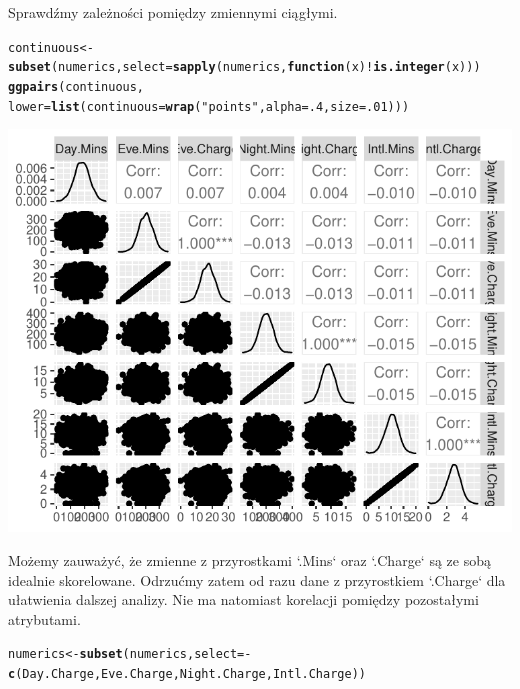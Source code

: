 \documentclass{article}\usepackage[]{graphicx}\usepackage[]{color}
\makeatletter
\def\maxwidth{ %
  \ifdim\Gin@nat@width>\linewidth
    \linewidth
  \else
    \Gin@nat@width
  \fi
}
\newcommand{\hlnum}[1]{\textcolor[rgb]{0.686,0.059,0.569}{#1}}%
\newcommand{\hlstr}[1]{\textcolor[rgb]{0.192,0.494,0.8}{#1}}%
\newcommand{\hlopt}[1]{\textcolor[rgb]{0,0,0}{#1}}%
\newcommand{\hlstd}[1]{\textcolor[rgb]{0.345,0.345,0.345}{#1}}%
\newcommand{\hlkwa}[1]{\textcolor[rgb]{0.161,0.373,0.58}{\textbf{#1}}}%
\newcommand{\hlkwb}[1]{\textcolor[rgb]{0.69,0.353,0.396}{#1}}%
\newcommand{\hlkwc}[1]{\textcolor[rgb]{0.333,0.667,0.333}{#1}}%
\newcommand{\hlkwd}[1]{\textcolor[rgb]{0.737,0.353,0.396}{\textbf{#1}}}%
\newenvironment{kframe}{%
 \def\at@end@of@kframe{}%
 \ifinner\ifhmode%
  \def\at@end@of@kframe{\end{minipage}}%
  \begin{minipage}{\columnwidth}%
 \fi\fi%
 \def\FrameCommand##1{\hskip\@totalleftmargin \hskip-\fboxsep
 \colorbox{shadecolor}{##1}\hskip-\fboxsep
     \hskip-\linewidth \hskip-\@totalleftmargin \hskip\columnwidth}%
 \MakeFramed {\advance\hsize-\width
   \@totalleftmargin\z@ \linewidth\hsize
   \@setminipage}}%
 {\par\unskip\endMakeFramed%
 \at@end@of@kframe}
\newenvironment{knitrout}{}{} %
\makeatother
\begin{document}
Sprawdźmy zależności pomiędzy zmiennymi ciągłymi.
\begin{knitrout}
\color{fgcolor}\begin{kframe}
\begin{alltt}
\hlstd{continuous} \hlkwb{<-} \hlkwd{subset}\hlstd{(numerics,} \hlkwc{select}\hlstd{=}\hlkwd{sapply}\hlstd{(numerics,} \hlkwa{function}\hlstd{(}\hlkwc{x}\hlstd{)} \hlopt{!}\hlkwd{is.integer}\hlstd{(x)))}
\hlkwd{ggpairs}\hlstd{(continuous,}
        \hlkwc{lower}\hlstd{=}\hlkwd{list}\hlstd{(}\hlkwc{continuous}\hlstd{=}\hlkwd{wrap}\hlstd{(}\hlstr{"points"}\hlstd{,} \hlkwc{alpha}\hlstd{=}\hlnum{.4}\hlstd{,} \hlkwc{size}\hlstd{=}\hlnum{.01}\hlstd{)))}
\end{alltt}
\end{kframe}

{\centering \includegraphics[width=\maxwidth]{figure/Pair_plot_for_continuous_variables-1} 

}



\end{knitrout}
Możemy zauważyć, że zmienne z przyrostkami `.Mins` oraz `.Charge` są ze sobą idealnie skorelowane. Odrzućmy zatem od razu dane z przyrostkiem `.Charge` dla ułatwienia dalszej analizy. Nie ma natomiast korelacji pomiędzy pozostałymi atrybutami.

\begin{knitrout}
\color{fgcolor}\begin{kframe}
\begin{alltt}
\hlstd{numerics} \hlkwb{<-} \hlkwd{subset}\hlstd{(numerics,} \hlkwc{select}\hlstd{=}\hlopt{-}\hlkwd{c}\hlstd{(Day.Charge, Eve.Charge, Night.Charge, Intl.Charge))}
\end{alltt}
\end{kframe}
\end{knitrout}
\end{document}
